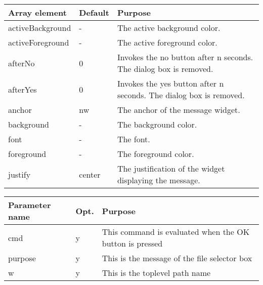 {\newpage
\clearpage
\samepage \begin{tabular}{|l|l|p{5.5cm}|} \hline
Array element    & Default & Purpose \\  \hline
activeBackground & -       & The active background
                             color.\\  \hline
activeForeground & -       & The active foreground
                             color.\\  \hline
afterNo          & 0       & Invokes the no button after
                             n seconds. The dialog box
                             is removed.\\  \hline
afterYes         & 0       & Invokes the yes button after
                             n seconds. The dialog box
                             is removed.\\  \hline
anchor           & nw      & The anchor of the message
                             widget.\\  \hline
background       & -       & The background color.\\  \hline
font             & -       & The font.\\  \hline
foreground       & -       & The foreground color.\\  \hline
justify          & center  & The justification of the
                             widget displaying the
                             message.\\  \hline
\end{tabular}
}

{\newpage
\clearpage
\samepage \begin{figure}[ht]
  \centerline{
  \epsfysize=4cm
  }
  
  \label{fig:YesNoBox}
\end{figure}
}

{\newpage
\clearpage
\samepage \begin{tabular}{|l|l|p{6.5cm}|} \hline
Parameter name  & Opt. & Purpose \\  \hline
cmd             & y    & This command is evaluated when
                         the OK button is pressed\\  \hline
purpose         & y    & This is the message of the
                         file selector box\\  \hline
w               & y    & This is the toplevel path
                         name\\  \hline
\end{tabular}
}

